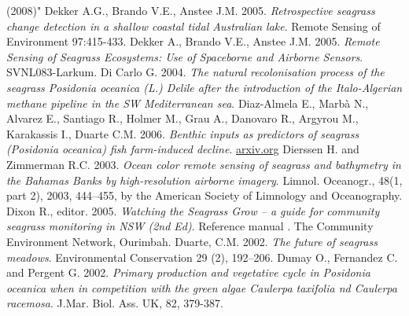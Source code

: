 \documentclass[11pt]{article}
\begin{document}
\begin{thebibliography}{999}
(2008)" \pageref{Dehouck08}
Dekker A.G., Brando V.E., Anstee J.M. 2005. \emph{Retrospective seagrass change detection in a shallow coastal tidal Australian lake}. Remote Sensing of Environment 97:415-433. \pageref{Dekker05a}
Dekker A., Brando V.E., Anstee J.M. 2005. \emph{Remote Sensing of Seagrass Ecosystems: Use of Spaceborne and Airborne Sensors}. SVNL083-Larkum. \pageref{Dekker05b}
Di Carlo G. 2004. \emph{The natural recolonisation process of the seagrass Posidonia
oceanica (L.) Delile after the introduction of the Italo-Algerian methane pipeline in the SW
Mediterranean sea}.\pageref{DiCarlo04}
Diaz-Almela E., Marb\`a N., Alvarez E., Santiago R., Holmer M., Grau A., Danovaro R., Argyrou M., Karakassis I., Duarte C.M. 2006. \emph{Benthic inputs as predictors of seagrass (\textit{Posidonia oceanica}) fish farm-induced decline}. \href{http://arxiv.org/ftp/qbio/papers/0611/0611006.pdf}{arxiv.org} \pageref{Diaz-Almela06}
Dierssen H. and Zimmerman R.C. 2003. \emph{Ocean color remote sensing of seagrass and
bathymetry in the Bahamas Banks by high-resolution airborne imagery}. Limnol. Oceanogr.,
48(1, part 2), 2003, 444–455, by the American Society of Limnology and Oceanography. \pageref{Dierssen03}
Dixon R., editor. 2005. \emph{Watching the Seagrass Grow – a guide for community seagrass
monitoring in NSW (2nd Ed)}. Reference manual . The Community Environment Network,
Ourimbah. \pageref{Dixon05}
Duarte, C.M. 2002. \emph{The future of seagrass meadows}. Environmental Conservation 29 (2), 192–206. \pageref{Duarte02}
Dumay O., Fernandez C. and Pergent G. 2002. \emph{Primary production and vegetative cycle in \textit{Posidonia oceanica} when in competition with the green algae Caulerpa taxifolia nd
Caulerpa racemosa}. J.Mar. Biol. Ass. UK, 82, 379-387. \pageref{Dumay02}

\end{thebibliography}
\end{document}
